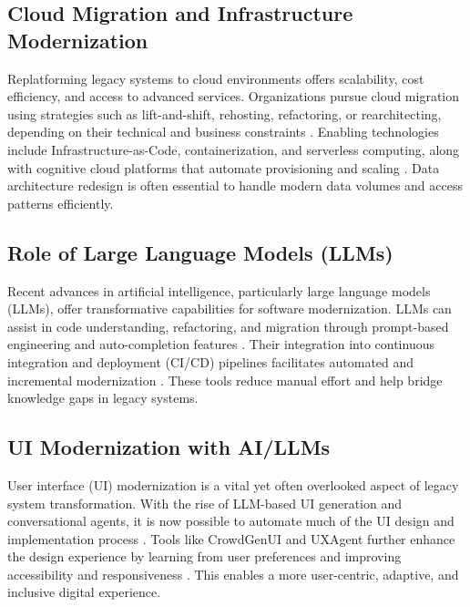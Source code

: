 \documentclass[12pt]{article}
\begin{document}
\subsection{Cloud Migration and Infrastructure Modernization}

Replatforming legacy systems to cloud environments offers scalability, cost efficiency, and access to advanced services. Organizations pursue cloud migration using strategies such as lift-and-shift, rehosting, refactoring, or rearchitecting, depending on their technical and business constraints \cite{hasan2023}. Enabling technologies include Infrastructure-as-Code, containerization, and serverless computing, along with cognitive cloud platforms that automate provisioning and scaling \cite{fahmideh2019, yousef2024}. Data architecture redesign is often essential to handle modern data volumes and access patterns efficiently.

\subsection{Role of Large Language Models (LLMs)}

Recent advances in artificial intelligence, particularly large language models (LLMs), offer transformative capabilities for software modernization. LLMs can assist in code understanding, refactoring, and migration through prompt-based engineering and auto-completion features \cite{talasila2023, sato2024}. Their integration into continuous integration and deployment (CI/CD) pipelines facilitates automated and incremental modernization \cite{llmigrate2025, schmid2025}. These tools reduce manual effort and help bridge knowledge gaps in legacy systems.

\subsection{UI Modernization with AI/LLMs}

User interface (UI) modernization is a vital yet often overlooked aspect of legacy system transformation. With the rise of LLM-based UI generation and conversational agents, it is now possible to automate much of the UI design and implementation process \cite{wu2024uicoder, park2024interface}. Tools like CrowdGenUI and UXAgent further enhance the design experience by learning from user preferences and improving accessibility and responsiveness \cite{liu2024crowdgenui, zhao2024uxagent}. This enables a more user-centric, adaptive, and inclusive digital experience.
\end{document}
